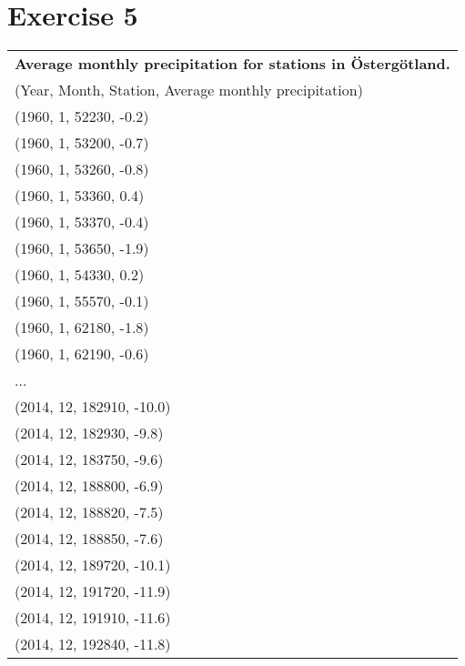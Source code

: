 \documentclass[a4paper,titlepage,12pt]{article}
\begin{document}
\section{Exercise 5}
\begin{tabular}{l}
\bf Average monthly precipitation for stations in Östergötland. \\ 
(Year, Month, Station, Average monthly precipitation) \\
\hline
(1960, 1, 52230, -0.2) \\ 
(1960, 1, 53200, -0.7) \\ 
(1960, 1, 53260, -0.8) \\
(1960, 1, 53360, 0.4)  \\
(1960, 1, 53370, -0.4) \\
(1960, 1, 53650, -1.9) \\
(1960, 1, 54330, 0.2)  \\
(1960, 1, 55570, -0.1) \\
(1960, 1, 62180, -1.8) \\
(1960, 1, 62190, -0.6) \\
... \\
(2014, 12, 182910, -10.0) \\
(2014, 12, 182930, -9.8)  \\
(2014, 12, 183750, -9.6)  \\
(2014, 12, 188800, -6.9)  \\
(2014, 12, 188820, -7.5)  \\
(2014, 12, 188850, -7.6)  \\
(2014, 12, 189720, -10.1) \\
(2014, 12, 191720, -11.9) \\
(2014, 12, 191910, -11.6) \\
(2014, 12, 192840, -11.8) \\
\end{tabular}
\end{document}
